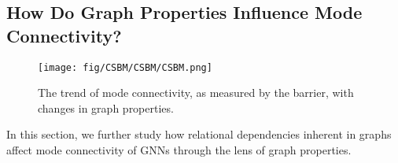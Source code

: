 \subsection{How Do Graph Properties Influence Mode Connectivity?}\label{sec:gp}
\label{sec: gp}
\begin{figure*}
    \centering
    \texttt{[image: fig/CSBM/CSBM/CSBM.png]}
    \vspace{-0.1in}
    \caption{The trend of mode connectivity, as measured by the barrier, with changes in graph properties.}
    \label{fig:gp}
    \vspace{-0.2in}
\end{figure*}

In this section, we further study how relational dependencies inherent in graphs affect mode connectivity of GNNs through the lens of graph properties. 

